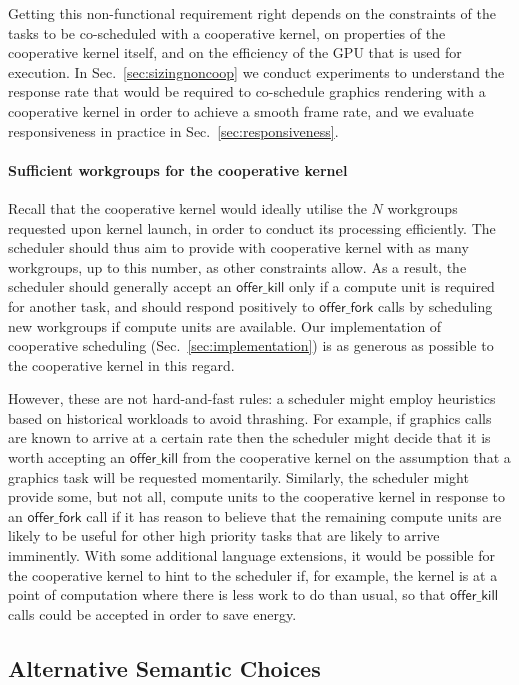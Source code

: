 \documentclass[numbers,nocopyrightspace,10pt]{sigplanconf}
\newcommand{\mysec}{Sec.~}
\newcommand{\offerfork}{\mathsf{offer\_fork}}
\newcommand{\offerkill}{\mathsf{offer\_kill}}
\begin{document}
Getting this non-functional requirement right depends on the
constraints of the tasks to be co-scheduled with a cooperative kernel,
on properties of the cooperative kernel itself, and on the efficiency
of the GPU that is used for execution.  In \mysec\ref{sec:sizingnoncoop} we conduct
experiments to understand the response rate that would be required to
co-schedule graphics rendering with a cooperative kernel in order to
achieve a smooth frame rate, and we evaluate responsiveness in
practice in \mysec\ref{sec:responsiveness}.

\paragraph{Sufficient workgroups for the cooperative kernel}

Recall that the cooperative kernel would ideally utilise the $N$
workgroups requested upon kernel launch, in order to conduct its
processing efficiently.  The scheduler should thus aim to provide with
cooperative kernel with as many workgroups, up to this number, as
other constraints allow.  As a result, the scheduler should generally
accept an $\offerkill$ only if a compute unit is required for another
task, and should respond positively to $\offerfork$ calls by
scheduling new workgroups if compute units are available.  Our
implementation of cooperative scheduling (\mysec\ref{sec:implementation}) is as
generous as possible to the cooperative kernel in this regard.

However, these are not hard-and-fast rules: a scheduler might employ
heuristics based on historical workloads to avoid thrashing.  For
example, if graphics calls are known to arrive at a certain rate then
the scheduler might decide that it is worth accepting an $\offerkill$
from the cooperative kernel on the assumption that a graphics task
will be requested momentarily.  Similarly, the scheduler might provide
some, but not all, compute units to the cooperative kernel in response
to an $\offerfork$ call if it has reason to believe that the remaining
compute units are likely to be useful for other high priority tasks
that are likely to arrive imminently.  With some additional language extensions, it would be possible for the cooperative kernel to hint to the scheduler if, for example, the kernel is at a point of computation where there is less work to do than usual, so that $\offerkill$ calls could be accepted in order to save energy.


\subsection{Alternative Semantic Choices}\label{sec:semanticalternatives}
\end{document}
